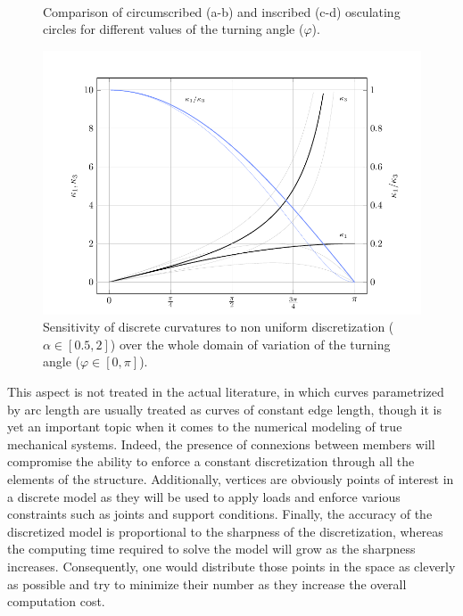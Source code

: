 \begin{figure}[!p]
	\captionsetup[subfloat]{captionskip=10pt}
	\centering
	\vspace{-5mm}
	\hspace{5mm}
	 \\[-10mm]
	\hspace{5mm}
	\caption{Comparison of circumscribed (a-b) and inscribed (c-d) osculating circles for different values of the turning angle ($\varphi$).}
	\label{fig:kb_animation}
	\vspace{0mm}
	\includegraphics{ch3_geometry/plot/2_bench_kb/build.pdf}
	\caption{Sensitivity of discrete curvatures to non uniform discretization ($\alpha \in [0.5,2]$) over the whole domain of variation of the turning angle ($\varphi \in [0,\pi]$).}
	\label{fig:kb_bench}
\end{figure}

This aspect is not treated in the actual literature, in which curves parametrized by arc length are usually treated as curves of constant edge length, though it is yet an important topic when it comes to the numerical modeling of true mechanical systems. Indeed, the presence of connexions between members will compromise the ability to enforce a constant discretization through all the elements of the structure. Additionally, vertices are obviously points of interest in a discrete model as they will be used to apply loads and enforce various constraints such as joints and support conditions. Finally, the accuracy of the discretized model is proportional to the sharpness of the discretization, whereas the computing time required to solve the model will grow as the sharpness increases. Consequently, one would distribute those points in the space as cleverly as possible and try to minimize their number as they increase the overall computation cost.


